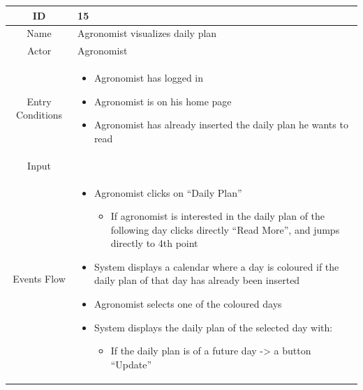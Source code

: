 \documentclass{article}
\begin{document}
\begin{center}
    \newpage
    
    
    
    
    
    
    
    
    \begin{longtable}{|c| p{10cm}|}
        \hline
            ID & 15 \\
        \hline
            Name & Agronomist visualizes daily plan\\
        \hline
            Actor & Agronomist \\
        \hline
            Entry Conditions &  \begin{itemize}
                                    \item Agronomist has logged in
                                    \item Agronomist is on his home page
                                    \item Agronomist has already inserted the daily plan he wants to read
                                \end{itemize}\\
        \hline
            Input & \\
        \hline
            Events Flow &   \begin{itemize}
                                \item Agronomist clicks on “Daily Plan” 
                                        \begin{itemize}
                                            \item If agronomist is interested in the daily plan of the following day clicks directly “Read More”, and jumps directly to 4th point
                                        \end{itemize}
                                \item System displays a calendar where a day is coloured if the daily plan of that day has already been inserted
                                \item Agronomist selects one of the coloured days
                                \item System displays the daily plan of the selected day with:
                                        \begin{itemize}
                                            \item If the daily plan is of a future day -> a button “Update” 

\end{itemize}
\end{itemize}
\end{longtable}
\end{center}
\end{document}
